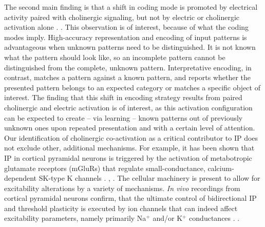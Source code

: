 The second main finding is that a shift in coding mode
        is promoted by electrical activity paired with cholinergic signaling,
        but not by electric or cholinergic activation alone
    .
    .
    This observation is of interest, because of what the coding modes imply.
    High-accuracy representation and encoding of input patterns is advantageous
        when unknown patterns need to be distinguished.
    It is not known what the pattern should look like,
        so an incomplete pattern cannot be distinguished from the complete, unknown pattern.
    Interpretative encoding, in contrast,
        matches a pattern against a known pattern,
        and reports whether
            the presented pattern belongs to an expected category
            or matches a specific object of interest.
    The finding that this shift in encoding strategy results
        from paired cholinergic and electric activation is of interest,
        as this activation configuration can be expected to create -- via learning --
        known patterns out of previously unknown ones
        upon repeated presentation and with a certain level of attention.
    Our identification of cholinergic co-activation as a critical contributor to IP
        does not exclude other, additional mechanisms.
    For example, it has been shown that IP in cortical pyramidal neurons
        is triggered by the activation of metabotropic glutamate receptors (mGluRs) that
            regulate small-conductance, calcium-dependent SK-type K channels \citep{Sourdet2003-qr}.
        ,
                .
    The cellular machinery is present to allow for excitability alterations by a variety of mechanisms.
    \textit{In vivo} recordings from cortical pyramidal neurons confirm, that
        the ultimate control of bidirectional IP and threshold plasticity is executed by ion channels
            that can indeed affect excitability parameters,
            namely primarily Na$^+$ and/or K$^+$ conductances \citep{Mahon2012-bt}.
        .


